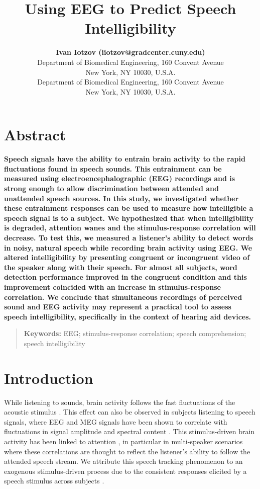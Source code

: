 \documentclass[10pt,letterpaper]{article}
\title{Using EEG to Predict Speech Intelligibility}
\author{{\large \bf Ivan Iotzov (iiotzov@gradcenter.cuny.edu)} \\
  Department of Biomedical Engineering, 160 Convent Avenue\\
New York, NY 10030, U.S.A.
  \AND {\large \bf Lucas C. Parra (parra@ccny.cuny.edu)} \\
  Department of Biomedical Engineering, 160 Convent Avenue\\
New York, NY 10030, U.S.A.}
\begin{document}
\maketitle


\section{Abstract}
{
\bf
Speech signals have the ability to entrain brain activity to the rapid 
fluctuations found in speech sounds. This entrainment can be measured 
using electroencephalographic (EEG) recordings and is strong enough to allow 
discrimination between attended and unattended speech sources. In this study,
we investigated whether these entrainment responses can be used to measure 
how intelligible a speech signal is to a subject. We hypothesized that when 
intelligibility is degraded, attention wanes and the stimulus-response 
correlation will decrease. To test this, we measured a listener's ability 
to detect words in noisy, natural speech while recording brain activity using 
EEG. We altered intelligibility by presenting congruent or incongruent video 
of the speaker along with their speech. For almost all subjects, word 
detection performance improved in the congruent condition and this improvement 
coincided with an increase in stimulus-response correlation. We conclude that 
simultaneous recordings of perceived sound and EEG activity may represent a 
practical tool to assess speech intelligibility, specifically in the context 
of hearing aid devices.
}

\begin{quote}
\small
\textbf{Keywords:} 
EEG; stimulus-response correlation; 
speech comprehension; speech intelligibility
\end{quote}

\section{Introduction}

While listening to sounds, brain activity follows the fast fluctuations of 
the acoustic stimulus \cite{Ding2014a,Haegens2018}. This effect can also
be observed in subjects listening to speech signals, 
where EEG and MEG signals have been shown to correlate 
with fluctuations in signal amplitude and spectral content 
\cite{Luo2007,Horton2014}. This stimulus-driven brain activity has been linked
to attention \cite{ZionGolumbic2013,OSullivan2015}, in particular in 
multi-speaker scenarios where these correlations are thought to reflect 
the listener's ability to follow the attended speech stream. We attribute this
speech tracking phenomenon to an exogenous stimulus-driven process due to the 
consistent responses elicited by a speech stimulus across subjects 
\cite{Ki2016,Cohen2017}. 
\end{document}
